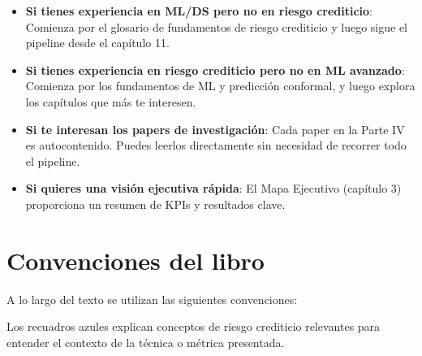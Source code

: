 \documentclass[
  spanish,
  11pt,
  letterpaper,
]{scrbook}
\providecommand{\tightlist}{%
  \setlength{\itemsep}{0pt}\setlength{\parskip}{0pt}}
\theoremstyle{plain}
\theoremstyle{remark}
\begin{document}
\begin{tcolorbox}[enhanced jigsaw, arc=.35mm, bottomrule=.15mm, bottomtitle=1mm, breakable, colback=white, colbacktitle=quarto-callout-tip-color!10!white, colframe=quarto-callout-tip-color-frame, coltitle=black, left=2mm, leftrule=.75mm, opacityback=0, opacitybacktitle=0.6, rightrule=.15mm, title=\textcolor{quarto-callout-tip-color}{\faLightbulb}\hspace{0.5em}{Guía de lectura por perfil}, titlerule=0mm, toprule=.15mm, toptitle=1mm]

\begin{itemize}
\tightlist
\item
  \textbf{Si tienes experiencia en ML/DS pero no en riesgo crediticio}:
  Comienza por el glosario de fundamentos de riesgo crediticio y luego
  sigue el pipeline desde el capítulo 11.
\item
  \textbf{Si tienes experiencia en riesgo crediticio pero no en ML
  avanzado}: Comienza por los fundamentos de ML y predicción conformal,
  y luego explora los capítulos que más te interesen.
\item
  \textbf{Si te interesan los papers de investigación}: Cada paper en la
  Parte IV es autocontenido. Puedes leerlos directamente sin necesidad
  de recorrer todo el pipeline.
\item
  \textbf{Si quieres una visión ejecutiva rápida}: El Mapa Ejecutivo
  (capítulo 3) proporciona un resumen de KPIs y resultados clave.
\end{itemize}

\end{tcolorbox}

\section{Convenciones del libro}\label{convenciones-del-libro}

A lo largo del texto se utilizan las siguientes convenciones:

\begin{tcolorbox}[enhanced jigsaw, arc=.35mm, bottomrule=.15mm, bottomtitle=1mm, breakable, colback=white, colbacktitle=quarto-callout-note-color!10!white, colframe=quarto-callout-note-color-frame, coltitle=black, left=2mm, leftrule=.75mm, opacityback=0, opacitybacktitle=0.6, rightrule=.15mm, title=\textcolor{quarto-callout-note-color}{\faInfo}\hspace{0.5em}{Concepto de riesgo crediticio}, titlerule=0mm, toprule=.15mm, toptitle=1mm]

Los recuadros azules explican conceptos de riesgo crediticio relevantes
para entender el contexto de la técnica o métrica presentada.

\end{tcolorbox}
\end{document}
